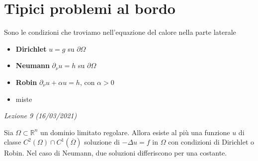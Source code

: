 \documentclass[10pt,a4paper,twoside,openright]{book}
\begin{document}
\section{Tipici problemi al bordo}

Sono le condizioni che troviamo nell'equazione del calore nella parte laterale
\begin{itemize}
\item \textbf{Dirichlet} $u=g$ su $\partial \Omega $
\item \textbf{Neumann} $\partial _{\nu } u=h$ su $\partial \Omega $
\item \textbf{Robin} $\partial _{\nu } u+\alpha u=h$, con $\alpha  >0$
\item miste
\end{itemize}
\textit{Lezione 9 (16/03/2021)}

\begin{theorem}
	Sia $\displaystyle \Omega \subset \mathbb{R}^{n}$ un dominio limitato regolare. Allora esiste al più una funzione $\displaystyle u$ di classe $\displaystyle C^{2}(\Omega) \cap C^{1}(\overline{\Omega })$ soluzione di $\displaystyle -\Delta u=f$ in $\displaystyle \Omega $ con condizioni di Dirichlet o Robin. Nel caso di Neumann, due soluzioni differiscono per una costante.
\end{theorem}
\end{document}
